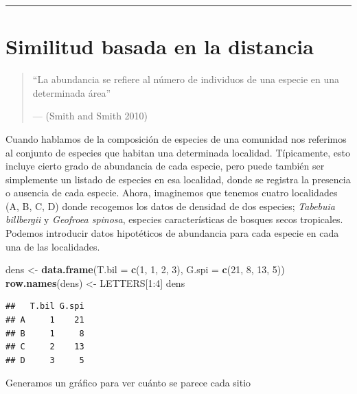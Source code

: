 \documentclass[]{book}
\newenvironment{Shaded}{\begin{snugshade}}{\end{snugshade}}
\newcommand{\KeywordTok}[1]{\textcolor[rgb]{0.13,0.29,0.53}{\textbf{{#1}}}}
\newcommand{\DataTypeTok}[1]{\textcolor[rgb]{0.13,0.29,0.53}{{#1}}}
\newcommand{\DecValTok}[1]{\textcolor[rgb]{0.00,0.00,0.81}{{#1}}}
\newcommand{\StringTok}[1]{\textcolor[rgb]{0.31,0.60,0.02}{{#1}}}
\newcommand{\NormalTok}[1]{{#1}}
\begin{document}
\begin{center}\rule{0.5\linewidth}{\linethickness}\end{center}

\section{Similitud basada en la
distancia}\label{similitud-basada-en-la-distancia-1}

\begin{quote}
``La abundancia se refiere al número de individuos de una especie en una
determinada área''

--- (Smith and Smith 2010)
\end{quote}

Cuando hablamos de la composición de especies de una comunidad nos
referimos al conjunto de especies que habitan una determinada localidad.
Típicamente, esto incluye cierto grado de abundancia de cada especie,
pero puede también ser simplemente un listado de especies en esa
localidad, donde se registra la presencia o ausencia de cada especie.
Ahora, imaginemos que tenemos cuatro localidades (A, B, C, D) donde
recogemos los datos de densidad de dos especies; \emph{Tabebuia
billbergii} y \emph{Geofroea spinosa}, especies características de
bosques secos tropicales. Podemos introducir datos hipotéticos de
abundancia para cada especie en cada una de las localidades.

\begin{Shaded}
\begin{Highlighting}[]
\NormalTok{dens <-}\StringTok{ }\KeywordTok{data.frame}\NormalTok{(}\DataTypeTok{T.bil =} \KeywordTok{c}\NormalTok{(}\DecValTok{1}\NormalTok{, }\DecValTok{1}\NormalTok{, }\DecValTok{2}\NormalTok{, }\DecValTok{3}\NormalTok{), }\DataTypeTok{G.spi =} \KeywordTok{c}\NormalTok{(}\DecValTok{21}\NormalTok{, }\DecValTok{8}\NormalTok{, }\DecValTok{13}\NormalTok{, }\DecValTok{5}\NormalTok{)) }
\KeywordTok{row.names}\NormalTok{(dens) <-}\StringTok{ }\NormalTok{LETTERS[}\DecValTok{1}\NormalTok{:}\DecValTok{4}\NormalTok{]}
\NormalTok{dens}
\end{Highlighting}
\end{Shaded}

\begin{verbatim}
##   T.bil G.spi
## A     1    21
## B     1     8
## C     2    13
## D     3     5
\end{verbatim}

Generamos un gráfico para ver cuánto se parece cada sitio
\end{document}

